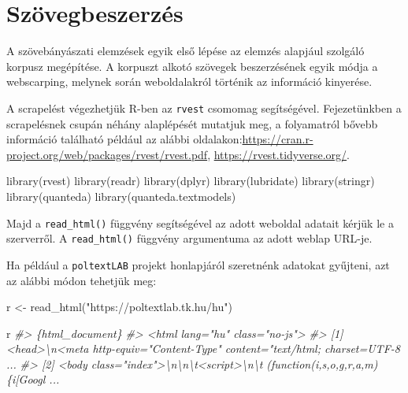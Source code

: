 \documentclass[
]{book}
\newenvironment{Shaded}{\begin{snugshade}}{\end{snugshade}}
\newcommand{\CommentTok}[1]{\textcolor[rgb]{0.56,0.35,0.01}{\textit{#1}}}
\newcommand{\FunctionTok}[1]{\textcolor[rgb]{0.00,0.00,0.00}{#1}}
\newcommand{\NormalTok}[1]{#1}
\newcommand{\OtherTok}[1]{\textcolor[rgb]{0.56,0.35,0.01}{#1}}
\newcommand{\StringTok}[1]{\textcolor[rgb]{0.31,0.60,0.02}{#1}}
\begin{document}
\hypertarget{szuxf6vegbeszerzuxe9s}{%
\section{Szövegbeszerzés}\label{szuxf6vegbeszerzuxe9s}}

A szövebányászati elemzések egyik első lépése az elemzés alapjául
szolgáló korpusz megépítése. A korpuszt alkotó szövegek beszerzésének
egyik módja a webscarping, melynek során weboldalakról történik az
információ kinyerése.

A scrapelést végezhetjük R-ben az \texttt{rvest} csomomag segítségével.
Fejezetünkben a scrapelésnek csupán néhány alaplépését mutatjuk meg, a
folyamatról bővebb információ található például az alábbi
oldalakon:\url{https://cran.r-project.org/web/packages/rvest/rvest.pdf},
\url{https://rvest.tidyverse.org/}.

\begin{Shaded}
\begin{Highlighting}[]

\FunctionTok{library}\NormalTok{(rvest)}
\FunctionTok{library}\NormalTok{(readr)}
\FunctionTok{library}\NormalTok{(dplyr)}
\FunctionTok{library}\NormalTok{(lubridate)}
\FunctionTok{library}\NormalTok{(stringr)}
\FunctionTok{library}\NormalTok{(quanteda)}
\FunctionTok{library}\NormalTok{(quanteda.textmodels)}
\end{Highlighting}
\end{Shaded}

Majd a \texttt{read\_html()} függvény segítségével az adott weboldal
adatait kérjük le a szerverről. A \texttt{read\_html()} függvény
argumentuma az adott weblap URL-je.

Ha például a \texttt{poltextLAB} projekt honlapjáról szeretnénk adatokat
gyűjteni, azt az alábbi módon tehetjük meg:

\begin{Shaded}
\begin{Highlighting}[]

\NormalTok{r }\OtherTok{\textless{}{-}} \FunctionTok{read\_html}\NormalTok{(}\StringTok{"https://poltextlab.tk.hu/hu"}\NormalTok{)}

\NormalTok{r}
\CommentTok{\#\textgreater{} \{html\_document\}}
\CommentTok{\#\textgreater{} \textless{}html lang="hu" class="no{-}js"\textgreater{}}
\CommentTok{\#\textgreater{} [1] \textless{}head\textgreater{}\textbackslash{}n\textless{}meta http{-}equiv="Content{-}Type" content="text/html; charset=UTF{-}8 ...}
\CommentTok{\#\textgreater{} [2] \textless{}body class="index"\textgreater{}\textbackslash{}n\textbackslash{}n\textbackslash{}t\textless{}script\textgreater{}\textbackslash{}n\textbackslash{}t  (function(i,s,o,g,r,a,m)\{i[\textquotesingle{}Googl ...}
\end{Highlighting}
\end{Shaded}
\end{document}
